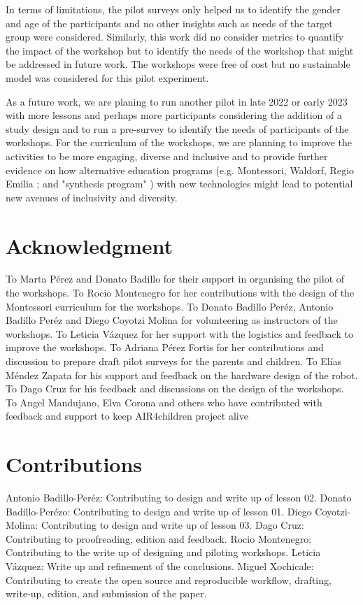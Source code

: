 \documentclass[conference]{IEEEtran}
\begin{document}
In terms of limitations, the pilot surveys only helped us to identify the gender and age of the participants and no other insights such as needs of the target group were considered.
Similarly, this work did no consider metrics to quantify the impact of the workshop but to identify the needs of the workshop that might be addressed in future work.
The workshops were free of cost but no sustainable model was considered for this pilot experiment.

As a future work, we are planing to run another pilot in late 2022 or early 2023 with more lessons and perhaps more participants considering the addition of a study design and to run a pre-survey to identify the needs of participants of the workshops.
For the curriculum of the workshops, we are planning to improve the activities to be more engaging, diverse and inclusive and to provide further evidence on how alternative education programs (e.g. Montessori, Waldorf, Regio Emilia \cite{edwards2002}; and "synthesis program"  \cite{synthesis2022}) with new technologies might lead to potential new avenues of inclusivity and diversity.



\section*{Acknowledgment}
To Marta P\'erez and Donato Badillo for their support in organising the pilot of the workshops.
To Rocio Montenegro for her contributions with the design of the Montessori curriculum for the workshops.
To Donato Badillo Per\'ez, Antonio Badillo Per\'ez and Diego Coyotzi Molina for volunteering as instructors of the workshops.
To Leticia V\'azquez for her support with the logistics and feedback to improve the workshops.
To Adriana P\'erez Fortis for her contributions and discussion to prepare draft pilot surveys for the parents and children. 
To El\'ias M\'endez Zapata for his support and feedback on the hardware design of the robot.
To Dago Cruz for his feedback and discussions on the design of the workshops.
To Angel Mandujano, Elva Corona and others who have contributed with feedback and support to keep AIR4children project alive

\section*{Contributions}
Antonio Badillo-Per\'ez: Contributing to design and write up of lesson 02.
Donato Badillo-Per\'ezo: Contributing to design and write up of lesson 01.
Diego Coyotzi-Molina: Contributing to design and write up of lesson 03.
Dago Cruz: Contributing to proofreading, edition and feedback.
Rocio Montenegro: Contributing to the write up of designing and piloting workshops. 
Leticia V\'azquez: Write up and refinement of the conclusions.
Miguel Xochicale: Contributing to create the open source and reproducible workflow, drafting, write-up, edition, and submission of the paper. 


\end{document}
